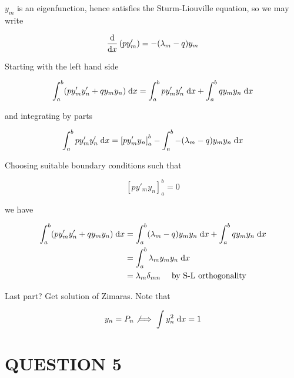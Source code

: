 \documentclass[a4paper]{article}
\begin{document}
$ y_{m} $ is an eigenfunction, hence satisfies the Sturm-Liouville equation, so we may write

\[ \frac{\mathrm{d} }{\mathrm{d} x} \left( p y_{m}' \right) = - ( \lambda_{m} - q)y_{m}     \]

Starting with the left hand side

\begin{align*}
\int_{a}^{b}  (p y'_{m}  y'_{n} + q y_{m}y_{n} ) \; \mathrm{d} x & = \int_{a}^{b} p y'_{m}  y'_{n} \; \mathrm{d} x + \int_{a}^{b} q y_{m}y_{n} \; \mathrm{d} x \\
\end{align*}

and integrating by parts

\begin{align*}
\int_{a}^{b} p y'_{m}  y'_{n} \; \mathrm{d} x & =  \left[  p y'_{m} y_{n} \right]_{a}^{b} - \int_{a}^{b} - ( \lambda_{m} - q)y_{m} y_{n} \; \mathrm{d} x   \\
\end{align*}

Choosing suitable boundary conditions such that

\[ \left[  p y'_{m} y_{n} \right]_{a}^{b} = 0 \]

we have 

\begin{align*}
\int_{a}^{b}  (p y'_{m}  y'_{n} + q y_{m}y_{n} ) \; \mathrm{d} x & =  \int_{a}^{b} ( \lambda_{m} - q)y_{m} y_{n} \; \mathrm{d} x  + \int_{a}^{b} q y_{m}y_{n} \; \mathrm{d} x \\
& =  \int_{a}^{b} \lambda_{m}y_{m} y_{n} \; \mathrm{d} x  \\
& = \lambda_{m} \delta_{mn} \quad \text{ by S-L orthogonality}
\end{align*}

Last part? Get solution of Zimaras. Note that 

\[ y_{n} = P_{n} \not\implies \int y_{n}^{2} \; \mathrm{d} x = 1 \]


\section{QUESTION 5}
\end{document}
